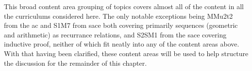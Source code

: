 \documentclass[twoside,12pt,a4paper]{report}
\begin{document}
This broad content area grouping of topics covers almost all of the content in all the curriculums considered here. The only notable exceptions being MMu2t2 from the \gls{ac} and S1M7 from \gls{sace} both covering primarily sequences (geometric and arithmetic) as recurrance relations, and S2SM1 from the \gls{sace} covering inductive proof, neither of which fit neatly into any of the content areas above. With that having been clarified, these content areas will be used to help structure the discussion for the remainder of this chapter.

%
\end{document}
